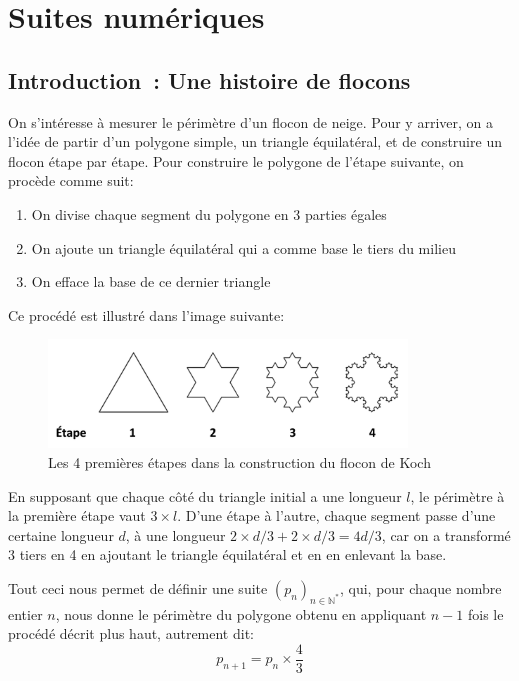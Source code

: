 \chapter{Suites numériques}

\label{chap:suite}
\section{Introduction~: Une histoire de flocons}
On s'intéresse à mesurer le périmètre d'un flocon de neige. Pour y arriver, on a l'idée de partir d'un polygone simple, un triangle équilatéral, et de construire un flocon étape par étape. Pour construire le polygone de l'étape suivante, on procède comme suit:
\begin{enumerate}
    \item On divise chaque segment du polygone en 3 parties égales
    \item On ajoute un triangle équilatéral qui a comme base le tiers du milieu
    \item On efface la base de ce dernier triangle
\end{enumerate}
Ce procédé est illustré dans l'image suivante:
\begin{figure}[H]
\centering \includegraphics[width = 0.85\textwidth]{./assets/imgs/Koch-snowflake.png}
\caption{Les 4 premières étapes dans la construction du flocon de Koch}
\label{fig:koch}
\end{figure}
En supposant que chaque côté du triangle initial a une longueur $l$, le périmètre à la première étape vaut $3\times l$. D'une étape à l'autre, chaque segment passe d'une certaine longueur $d$, à une longueur $2\times d/3 + 2\times d/3 = 4d/3$, car on a transformé 3 tiers en 4 en ajoutant le triangle équilatéral et en en enlevant la base. 

Tout ceci nous permet de définir une suite $(p_n)_{n\in \mathbb N^*}$, qui, pour chaque nombre entier $n$, nous donne le périmètre du polygone obtenu en appliquant $n-1$ fois le procédé décrit plus haut, autrement dit:
\begin{equation}
    p_{n+1} = p_n\times \frac{4}{3} \label{eqn:koch}
\end{equation}

